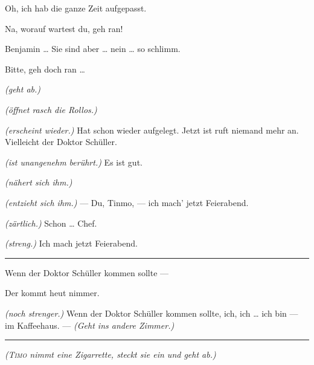 \documentclass[
	final,
	a4paper,
	ngerman,
	mpinclude = true, %
	twoside = true,
	open = right,
	cleardoublepage = plain,
	DIV = 13,
	BCOR = 1cm,
	titlepage = firstiscover,
	]{scrbook}
\newcommand{\direction}[1]{\textit{(#1)}}
\newenvironment{deletion}{%
		\vspace{0.25\baselineskip}
		\hrule
		\vspace{0.25\baselineskip}
		\color{darkgray}
	}{
		\color{black}
		\vspace{0.25\baselineskip}
		\hrule 
		\vspace{0.25\baselineskip}
	}
\newcommand{\thecharacter}[1]{\textup{\textsc{#1}}\xspace}
\newcommand{\thepraktikant}{\thecharacter{Timo}}
\newcommand{\theherr}{\thecharacter{Benjamin}}
\newcommand{\character}[1]{\item[#1:]}
\newcommand{\praktikant}{\character{\thepraktikant}}
\newcommand{\herr}{\character{\theherr}}
\begin{document}
\begin{play}
	\praktikant
	Oh, ich hab die ganze Zeit aufgepasst.

	\herr
	Na, worauf wartest du, geh ran!

	\praktikant
	Benjamin \ldots{} Sie sind aber \ldots{} nein \ldots{} so schlimm.

	\herr
	Bitte, geh doch ran \ldots{}

	\praktikant
	\direction{geht ab.}

	\herr
	\direction{öffnet rasch die Rollos.}

	\praktikant
	\direction{erscheint wieder.} Hat schon wieder aufgelegt. Jetzt ist ruft niemand mehr an. Vielleicht der Doktor Schüller.

	\herr
	\direction{ist unangenehm berührt.} Es ist gut.

	\praktikant
	\direction{nähert sich ihm.}

	\herr
	\direction{entzieht sich ihm.} --- Du, Tinmo, --- ich mach' jetzt Feierabend.

	\praktikant
	\direction{zärtlich.} Schon \ldots{} Chef.

	\herr
	\direction{streng.} Ich mach jetzt Feierabend.
	\begin{deletion}
		Wenn der Doktor Schüller kommen sollte ---

	\praktikant
	Der kommt heut nimmer.

	\herr
	\direction{noch strenger.} Wenn der Doktor Schüller kommen sollte, ich, ich \ldots{} ich bin --- im Kaffeehaus. --- \direction{Geht ins andere Zimmer.}
	\end{deletion}

	\direction{\thepraktikant{} nimmt eine Zigarrette, steckt sie ein und geht ab.}
\end{play}
\end{document}
